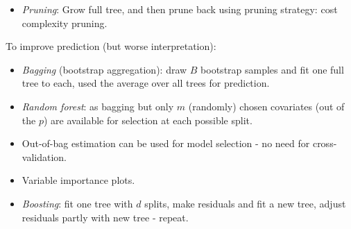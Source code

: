 \documentclass[10pt,ignorenonframetext,]{beamer}
\providecommand{\tightlist}{%
  \setlength{\itemsep}{0pt}\setlength{\parskip}{0pt}}
\begin{document}
\begin{frame}

\begin{itemize}
\tightlist
\item
  \emph{Pruning}: Grow full tree, and then prune back using pruning
  strategy: cost complexity pruning.
\end{itemize}

To improve prediction (but worse interpretation):

\begin{itemize}
\item
  \emph{Bagging} (bootstrap aggregation): draw \(B\) bootstrap samples
  and fit one full tree to each, used the average over all trees for
  prediction.
\item
  \emph{Random forest}: as bagging but only \(m\) (randomly) chosen
  covariates (out of the \(p\)) are available for selection at each
  possible split.
\item
  Out-of-bag estimation can be used for model selection - no need for
  cross-validation.
\item
  Variable importance plots.
\item
  \emph{Boosting}: fit one tree with \(d\) splits, make residuals and
  fit a new tree, adjust residuals partly with new tree - repeat.
\end{itemize}

\end{frame}
\end{document}
